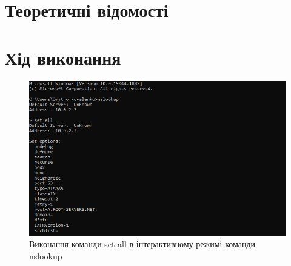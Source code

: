\documentclass{article}
\begin{document}
\begin{normalsize}
\section*{Теоретичні відомості}

\section*{Хід виконання}

\begin{figure}[H]
	\centering
	\includegraphics[width=\textwidth]{0}
	\caption{Виконання команди set all в інтерактивному режимі команди nslookup}
\end{figure}
 

\end{normalsize}
\end{document}
